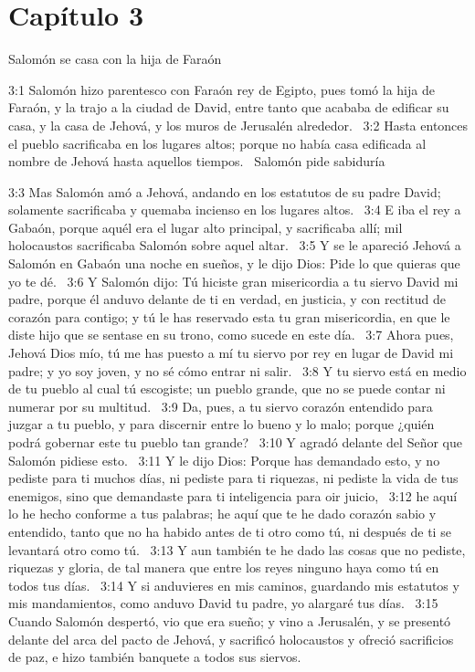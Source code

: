 \section*{Capítulo 3}
Salomón se casa con la hija de Faraón  

3:1 Salomón hizo parentesco con Faraón rey de Egipto, pues tomó la hija de Faraón, y la trajo a la ciudad de David, entre tanto que acababa de edificar su casa, y la casa de Jehová, y los muros de Jerusalén alrededor.  
3:2 Hasta entonces el pueblo sacrificaba en los lugares altos; porque no había casa edificada al nombre de Jehová hasta aquellos tiempos.  
Salomón pide sabiduría  

3:3 Mas Salomón amó a Jehová, andando en los estatutos de su padre David; solamente sacrificaba y quemaba incienso en los lugares altos.  
3:4 E iba el rey a Gabaón, porque aquél era el lugar alto principal, y sacrificaba allí; mil holocaustos sacrificaba Salomón sobre aquel altar.  
3:5 Y se le apareció Jehová a Salomón en Gabaón una noche en sueños, y le dijo Dios: Pide lo que quieras que yo te dé.  
3:6 Y Salomón dijo: Tú hiciste gran misericordia a tu siervo David mi padre, porque él anduvo delante de ti en verdad, en justicia, y con rectitud de corazón para contigo; y tú le has reservado esta tu gran misericordia, en que le diste hijo que se sentase en su trono, como sucede en este día.  
3:7 Ahora pues, Jehová Dios mío, tú me has puesto a mí tu siervo por rey en lugar de David mi padre; y yo soy joven, y no sé cómo entrar ni salir.  
3:8 Y tu siervo está en medio de tu pueblo al cual tú escogiste; un pueblo grande, que no se puede contar ni numerar por su multitud.  
3:9 Da, pues, a tu siervo corazón entendido para juzgar a tu pueblo, y para discernir entre lo bueno y lo malo; porque ¿quién podrá gobernar este tu pueblo tan grande?  
3:10 Y agradó delante del Señor que Salomón pidiese esto.  
3:11 Y le dijo Dios: Porque has demandado esto, y no pediste para ti muchos días, ni pediste para ti riquezas, ni pediste la vida de tus enemigos, sino que demandaste para ti inteligencia para oir juicio,  
3:12 he aquí lo he hecho conforme a tus palabras; he aquí que te he dado corazón sabio y entendido, tanto que no ha habido antes de ti otro como tú, ni después de ti se levantará otro como tú.  
3:13 Y aun también te he dado las cosas que no pediste, riquezas y gloria, de tal manera que entre los reyes ninguno haya como tú en todos tus días.  
3:14 Y si anduvieres en mis caminos, guardando mis estatutos y mis mandamientos, como anduvo David tu padre, yo alargaré tus días.  
3:15 Cuando Salomón despertó, vio que era sueño; y vino a Jerusalén, y se presentó delante del arca del pacto de Jehová, y sacrificó holocaustos y ofreció sacrificios de paz, e hizo también banquete a todos sus siervos.  

